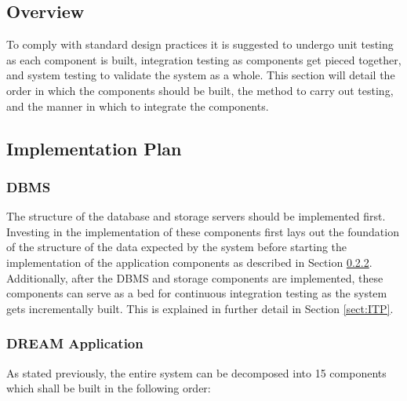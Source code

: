 \subsection{Overview}
\begin{flushleft}
To comply with standard design practices it is suggested to undergo unit testing as each component is built, integration testing as components get pieced together, and system testing to validate the system as a whole. This section will detail the order in which the components should be built, the method to carry out testing, and the manner in which to integrate the components.
\end{flushleft}

\subsection{Implementation Plan}
\subsubsection{DBMS}
\begin{flushleft}
The structure of the database and storage servers should be implemented first. Investing in the implementation of these components first lays out the foundation of the structure of the data expected by the system before starting the implementation of the application components as described in Section \ref{sect:AppIIT}. Additionally, after the DBMS and storage components are implemented, these components can serve as a bed for continuous integration testing as the system gets incrementally built. This is explained in further detail in Section \ref{sect:ITP}. 
\end{flushleft}

\subsubsection{DREAM Application}
\label{sect:AppIIT}
\begin{flushleft}
As stated previously, the entire system can be decomposed into 15 components which shall be built in the following order: 
\end{flushleft}

